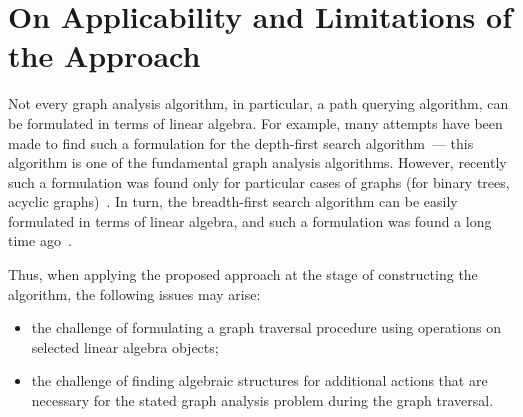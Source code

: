 \section{On Applicability and Limitations of the Approach}
Not every graph analysis algorithm, in particular, a path querying algorithm, can be formulated in terms of linear algebra. For example, many attempts have been made to find such a formulation for the depth-first search algorithm~--- this algorithm is one of the fundamental graph analysis algorithms. However, recently such a formulation was found only for particular cases of graphs (for binary trees, acyclic graphs)~\cite{spampinato2019linear}. In turn, the breadth-first search algorithm can be easily formulated in terms of linear algebra, and such a formulation was found a long time ago~\cite{kepner2011graph}.

Thus, when applying the proposed approach at the stage of constructing the algorithm, the following issues may arise:

\begin{itemize}
    \item the challenge of formulating a graph traversal procedure using operations on selected linear algebra objects;
    \item the challenge of finding algebraic structures for additional actions that are necessary for the stated graph analysis problem during the graph traversal.
\end{itemize}

